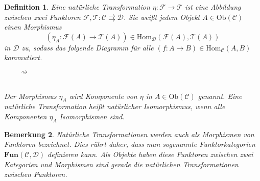 \documentclass[a4paper, 11pt]{scrartcl}
\newcommand{\Hom}{\text{Hom}}
\newcommand{\Ob}{\text{Ob}}
\newcommand{\CC}{\mathcal{C}}
\newcommand{\D}{\mathcal{D}}
\theoremstyle{basicstyle}
\newtheorem{definition}{Definition}[section]
\newtheorem{bemerkung}[definition]{Bemerkung}
\begin{document}
    \begin{definition}
        Eine \emph{natürliche Transformation} \(\eta : \mathcal{F} \to \mathcal{T}\) ist eine Abbildung zwischen zwei Funktoren \(\mathcal{F}, \mathcal{T}: \mathcal{C} \rightrightarrows \mathcal{D}\).
        Sie weißt jedem Objekt \(A \in \Ob(\mathcal{C})\) einen Morphismus
        \[(\eta_A : \mathcal{F}(A) \to \mathcal{T}(A)) \in \Hom_\mathcal{D}(\mathcal{F}(A), \mathcal{T}(A))\] in \(\mathcal{D}\) zu, sodass das folgende Diagramm für alle \((f: A \to B) \in \Hom_{\mathcal{C}}(A,B)\) kommutiert.
        \begin{figure*}[ht!]
            \centering
            \(\qquad\rightsquigarrow\qquad\)
        \end{figure*} \\
        Der Morphismus \(\eta_A\) wird \emph{Komponente} von \(\eta\) in \(A \in \Ob(\mathcal{C})\) genannt.
        Eine natürliche Transformation heißt \emph{natürlicher Isomorphismus}, wenn alle Komponenten \(\eta_A\) Isomorphismen sind.
    \end{definition}

    \begin{bemerkung}\label{bem:1}
        Natürliche Transformationen werden auch als \emph{Morphismen von Funktoren} bezeichnet.
        Dies rührt daher, dass man sogenannte \emph{Funktorkategorien} \(\textbf{Fun}(\CC, \D)\) definieren kann.
        Als Objekte haben diese Funktoren zwischen zwei Kategorien und Morphismen sind gerade die natürlichen Transformationen zwischen Funktoren.
    \end{bemerkung}
\end{document}
